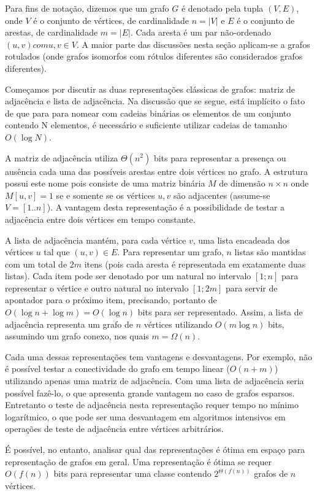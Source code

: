 Para fins de notação, dizemos que um grafo $G$ é denotado pela tupla $(V, E)$, onde $V$ é o conjunto de vértices, de cardinalidade $n = |V|$ e $E$ é o conjunto de arestas, de cardinalidade $m = |E|$. Cada aresta é um par não-ordenado $(u, v) com u,v \in V$. A maior parte das discussões nesta seção aplicam-se a grafos rotulados (onde grafos isomorfos com rótulos diferentes são considerados grafos diferentes).

Começamos por discutir as duas representações clássicas de grafos: matriz de adjacência e lista de adjacência. Na discussão que se segue, está implícito o fato de que para para nomear com cadeias binárias os elementos de um conjunto contendo N elementos, é necessário e suficiente utilizar cadeias de tamanho $O(\log N)$.

A matriz de adjacência utiliza $\Theta(n^2)$ bits para representar a presença ou ausência cada uma das possíveis arestas entre dois vértices no grafo. A estrutura possui este nome pois consiste de uma matriz binária $M$ de dimensão $n \times n$ onde $M[u,v] = 1$ se e somente se os vértices $u,v$ são adjacentes (assume-se $V = [1..n]$). A vantagem desta representação é a possibilidade de testar a adjacência entre dois vértices em tempo constante.

A lista de adjacência mantém, para cada vértice $v$, uma lista encadeada dos vértices $u$ tal que $(u, v) \in E$. Para representar um grafo, $n$ listas são mantidas com um total de $2m$ itens (pois cada aresta é representada em exatamente duas listas). Cada item pode ser denotado por um natural no intervalo $[1;n]$ para representar o vértice e outro natural no intervalo $[1;2m]$ para servir de apontador para o próximo item, precisando, portanto de $O(\log n + \log m) = O(\log n)$ bits para ser representado. Assim, a lista de adjacência representa um grafo de $n$ vértices utilizando $O(m \log n)$ bits, assumindo um grafo conexo, nos quais $m = \Omega(n)$.

Cada uma dessas representações tem vantagens e desvantagens. Por exemplo, não é possível testar a conectividade do grafo em tempo linear ($O(n + m)$) utilizando apenas uma matriz de adjacência. Com uma lista de adjacência seria possível fazê-lo, o que apresenta grande vantagem no caso de grafos esparsos. Entretanto o teste de adjacência nesta representação requer tempo no mínimo logarítmico, o que pode ser uma desvantagem em algoritmos intensivos em operações de teste de adjacência entre vértices arbitrários.

É possível, no entanto, analisar qual das representações é ótima em espaço para representação de grafos em geral. Uma representação é ótima se requer $O(f(n))$ bits para representar uma classe contendo $2^{\Theta(f(n))}$ grafos de $n$ vértices.

